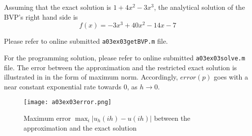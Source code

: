%
Assuming that the exact solution is $1 + 4x^2 - 3x^3$, the analytical solution of the BVP's right hand side is
\begin{equation}
	f(x) = -3x^3 + 40x^2 - 14x -7
\end{equation}

%
Please refer to online submitted \texttt{a03ex03getBVP.m} file.

%
For the programming solution, please refer to online submitted \texttt{a03ex03solve.m} file.
The error between the approximation and the restricted exact solution is illustrated in  in the form of maximum norm.
Accordingly, $error(p)$ goes with a near constant exponential rate towards 0, as $h \rightarrow 0$.
\begin{figure}[H]
	\texttt{[image: a03ex03error.png]} 
	\caption{Maximum error $\max_i|u_h (ih)-u(ih)|$ between the approximation and the exact solution}
	\label{fig:a03ex03error}
\end{figure}